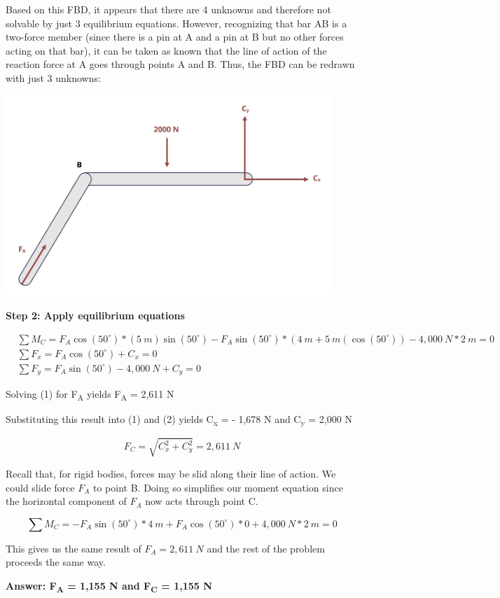 \documentclass[
  letterpaper,
  DIV=11,
  numbers=noendperiod]{scrreprt}
\theoremstyle{definition}
\theoremstyle{remark}
\begin{document}
\begin{tcolorbox}
\begin{tcolorbox}
Based on this FBD, it appears that there are 4 unknowns and therefore
not solvable by just 3 equilibrium equations. However, recognizing that
bar AB is a two-force member (since there is a pin at A and a pin at B
but no other forces acting on that bar), it can be taken as known that
the line of action of the reaction force at A goes through points A and
B. Thus, the FBD can be redrawn with just 3 unknowns:

\begin{center}
\includegraphics[width=4.83333in,height=\textheight]{images/CH1 PNGs/example 1.2 part 3.png}
\end{center}

\textbf{Step 2: Apply equilibrium equations}

\[
\begin{aligned}
& \sum M_C=F_A \cos \left(50^{\circ}\right)*(5{~m}) \sin \left(50^{\circ}\right)-F_A \sin \left(50^{\circ}\right) *\left(4{~m}+5{~m}\left(\cos \left(50^{\circ}\right)\right)-4,000{~ N}*2{~m}=0\right. \\
& \sum F_x=F_A \cos \left(50^{\circ}\right)+C_x=0 \\
& \sum F_y=F_A \sin \left(50^{\circ}\right)-4,000{~N}+C_y=0
\end{aligned}
\]

Solving (1) for F\textsubscript{A} yields F\textsubscript{A} = 2,611 N

Substituting this result into (1) and (2) yields C\textsubscript{x} = -
1,678 N and C\textsubscript{y} = 2,000 N

\[
F_C=\sqrt{C_x^2+C_y^2}=2,611{~N}
\]

Recall that, for rigid bodies, forces may be slid along their line of
action. We could slide force \(F_A\) to point B. Doing so simplifies our
moment equation since the horizontal component of \(F_A\) now acts
through point C.

\[
\sum M_C=-F_A \sin(50^\circ)*4{~m}+F_A \cos(50^\circ)*0+4,000{~N}*2{~m}=0
\]

This gives us the same result of \(F_A=2,611{~N}\) and the rest of the
problem proceeds the same way.

\textbf{Answer: F\textsubscript{A} = 1,155 N and F\textsubscript{C} =
1,155 N}

\end{tcolorbox}

\end{tcolorbox}
\end{document}
